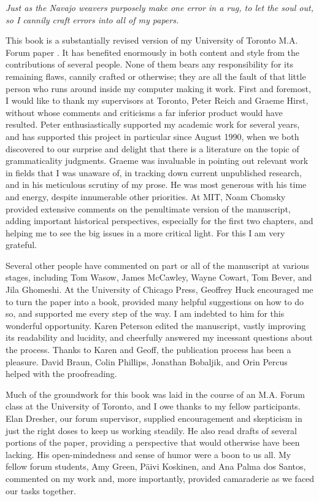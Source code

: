 \epigraph{\itshape Just as the Navajo weavers purposely make one error in a rug, to let the soul out, so I cannily craft errors into all of my papers.\\[-2\baselineskip]}{\citep{Ross1979}}

\noindent This book is a substantially revised version of my University of Toronto M.A. Forum paper \citep{Schutze1991}. It has benefited enormously in both content and style from the contributions of several people. None of them bears any responsibility for its remaining flaws, cannily crafted or otherwise; they are all the fault of that little person who runs around inside my computer making it work. First and foremost, I would like to thank my supervisors at Toronto, Peter Reich and Graeme Hirst, without whose comments and criticisms a far inferior product would have resulted. Peter enthusiastically supported my academic work for several years, and has supported this project in particular since August 1990, when we both discovered to our surprise and delight that there is a literature on the topic of grammaticality judgments. Graeme was invaluable in pointing out relevant work in fields that I was unaware of, in tracking down current unpublished research, and in his meticulous scrutiny of my prose. He was most generous with his time and energy, despite innumerable other priorities. At MIT, Noam Chomsky provided extensive comments on the penultimate version of the manuscript, adding important historical perspectives, especially for the first two chapters, and helping me to see the big issues in a more critical light. For this I am very grateful. 

Several other people have commented on part or all of the manuscript at various stages, including Tom Wasow, James McCawley, Wayne Cowart, Tom Bever, and Jila Ghomeshi. At the University of Chicago Press, Geoffrey Huck encouraged me to turn the paper into a book, provided many helpful suggestions on how to do so, and supported me every step of the way. I am indebted to him for this wonderful opportunity. Karen Peterson edited the manuscript, vastly improving its readability and lucidity, and cheerfully answered my incessant questions about the process. Thanks to Karen and Geoff, the publication process has been a pleasure. David Braun, Colin Phillips, Jonathan Bobaljik, and Orin Percus helped with the proofreading. 

Much of the groundwork for this book was laid in the course of an M.A. Forum class at the University of Toronto, and I owe thanks to my fellow participants. Elan Dresher, our forum supervisor, supplied encouragement and skepticism in just the right doses to keep us working steadily. He also read drafts of several portions of the paper, providing a perspective that would otherwise have been lacking. His open-mindedness and sense of humor were a boon to us all. My fellow forum students, Amy Green, Päivi Koskinen, and Ana Palma dos Santos, commented on my work and, more importantly, provided camaraderie as we faced our tasks together.

